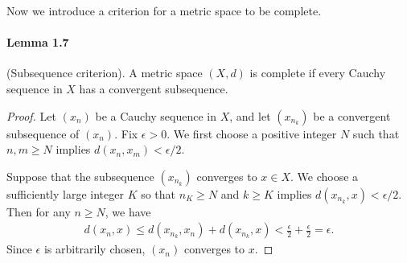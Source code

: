 \documentclass{article}
\begin{document}
Now we introduce a criterion for a metric space to be complete.

\paragraph{Lemma 1.7\label{lemma:1.7}} (Subsequence criterion).  A metric space $(X,d)$ is complete if every Cauchy sequence in $X$ has a convergent subsequence.
\begin{proof}
	Let $(x_n)$ be a Cauchy sequence in $X$, and let $(x_{n_k})$ be a convergent subsequence of $(x_n)$. Fix $\epsilon > 0$. We first choose a positive integer $N$ such that $n,m\geq N$ implies $d(x_n,x_m)<\epsilon / 2$.
	
	Suppose that the subsequence $(x_{n_k})$ converges to $x\in X$. We choose a sufficiently large integer $K$ so that $n_K\geq N$ and $k\geq K$ implies $d(x_{n_k},x)<\epsilon/2$. Then for any $n\geq N$, we have
	\begin{align*}
		d(x_n,x) \leq d(x_{n_k},x_n) + d(x_{n_k},x) < \frac{\epsilon}{2} + \frac{\epsilon}{2} = \epsilon.
	\end{align*}
	Since $\epsilon$ is arbitrarily chosen, $(x_n)$ converges to $x$.
\end{proof}
\end{document}
